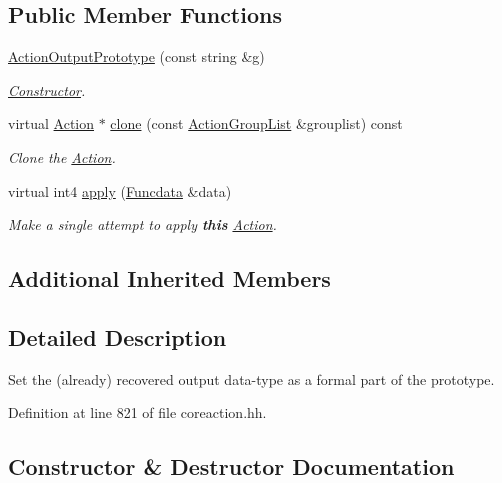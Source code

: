 \subsection*{Public Member Functions}
\begin{DoxyCompactItemize}
\item 
\mbox{\hyperlink{class_action_output_prototype_acb678135a6a44a1f341b74fc8033cbbb}{Action\+Output\+Prototype}} (const string \&g)
\begin{DoxyCompactList}\small\item\em \mbox{\hyperlink{class_constructor}{Constructor}}. \end{DoxyCompactList}\item 
virtual \mbox{\hyperlink{class_action}{Action}} $\ast$ \mbox{\hyperlink{class_action_output_prototype_abaa0684e2d727f785d3e45e091da5dd1}{clone}} (const \mbox{\hyperlink{class_action_group_list}{Action\+Group\+List}} \&grouplist) const
\begin{DoxyCompactList}\small\item\em Clone the \mbox{\hyperlink{class_action}{Action}}. \end{DoxyCompactList}\item 
virtual int4 \mbox{\hyperlink{class_action_output_prototype_a1ed1275253a29c1d09d2383c00e34a9c}{apply}} (\mbox{\hyperlink{class_funcdata}{Funcdata}} \&data)
\begin{DoxyCompactList}\small\item\em Make a single attempt to apply {\bfseries{this}} \mbox{\hyperlink{class_action}{Action}}. \end{DoxyCompactList}\end{DoxyCompactItemize}
\subsection*{Additional Inherited Members}


\subsection{Detailed Description}
Set the (already) recovered output data-\/type as a formal part of the prototype. 

Definition at line 821 of file coreaction.\+hh.



\subsection{Constructor \& Destructor Documentation}
\mbox{\label{class_action_output_prototype_acb678135a6a44a1f341b74fc8033cbbb}} 

